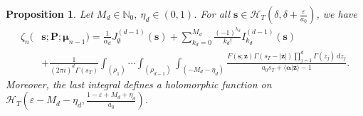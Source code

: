 \documentclass[a4paper,12pt]{article}
\newtheorem{prop}[thm]{Proposition}
\theoremstyle{definition}
\numberwithin{equation}{section}
\newcommand{\dd}{d}
\newcommand{\ii}{i}
\begin{document}
\begin{prop}
\label{prop:formula_zeta_n_shift_left}
Let $M_d \in \mathbb{N}_0, \ \eta_d \in (0,1)$. For all $\mathbf{s} \in \mathcal{H}_{T}(\delta,\delta+\frac{\varepsilon}{a_0})$, we have
\begin{align*}
    \zeta_{n}(&\mathbf{s};\mathbf{P};\boldsymbol{\mu}_{n-1})=\frac{1}{\alpha_d} J^{(d-1)}_{\emptyset}(\mathbf{s}) + \sum_{k_d=0}^{M_d} \frac{(-1)^{k_d}}{k_d!} I^{(d-1)}_{k_d}(\mathbf{s}) \\
    & + \frac{1}{(2\pi \ii)^d\Gamma(s_T)} \int_{(\rho_1)} \cdots \int_{(\rho_{d-1})}\int_{(-M_{d}-\eta_{d})} \frac{F(\mathbf{s};\mathbf{z})\Gamma(s_T-|\mathbf{z}|) \prod_{j=1}^d \Gamma(z_j) \, \dd z_j}{a_0s_T+\langle \boldsymbol{\alpha}|\mathbf{z}\rangle -1}.
\end{align*}
Moreover, the last integral defines a holomorphic function on $\mathcal{H}_T(\varepsilon-M_d-\eta_d,\frac{1-\varepsilon+M_d+\eta_d}{a_0})$.
\end{prop}
\end{document}
